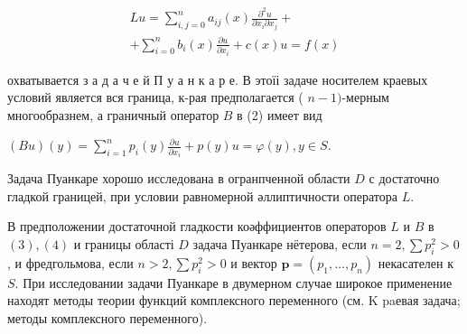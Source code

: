 \documentclass[10pt]{article}
\begin{document}
\[

\begin{gathered}

L u=\sum_{i, j=0}^{n} a_{i j}(x) \frac{\partial^{2} u}{\partial x_{i} \partial x_{j}}+ \\

+\sum_{i=0}^{n} b_{i}(x) \frac{\partial u}{\partial x_{i}}+c(x) u=f(x)

\end{gathered}

\]



охватывается з а д а ч е й П у а н к а р е. В этоїі задаче носителем краевых условий является вся граница, к-рая предполагается ( $n-1)$-мерным многообразнем, а граничный оператор $B$ в (2) имеет вид



$(B u)(y)=\sum_{i=1}^{n} p_{i}(y) \frac{\partial u}{\partial x_{i}}+p(y) u=\varphi(y), y \in S$.



Задача Пуанкаре хорошо исследована в огранпченной области $D$ с достаточно гладкой границей, при условии равномерной әллиптичности оператора $L$.



В предположении достаточной гладкости коәффициентов операторов $L$ и $B$ в $(3),(4)$ и границы області $D$ задача Пуанкаре нётерова, если $n=2, \sum p_{i}^{2}>0$, и фредгольмова, если $n>2, \sum p_{i}^{2}>0$ и вектор $\boldsymbol{p}=\left(p_{1}, \ldots, p_{n}\right)$ некасателен к $S$. При исследовании задачи Пуанкаре в двумерном случае широкое применение находят методы теории функций комплексного переменного (см. K paевая задача; методы комплексного переменного).
\end{document}
